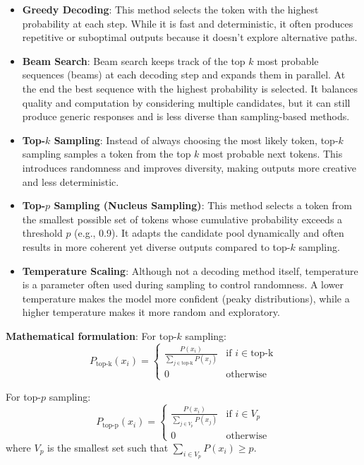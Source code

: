 \begin{itemize}
	\item \textbf{Greedy Decoding}: This method selects the token with the highest probability at each step. While it is fast and deterministic, it often produces repetitive or suboptimal outputs because it doesn't explore alternative paths.
	\item \textbf{Beam Search}: Beam search keeps track of the top \(k\) most probable sequences (beams) at each decoding step and expands them in parallel. At the end the best sequence with the highest probability is selected. It balances quality and computation by considering multiple candidates, but it can still produce generic responses and is less diverse than sampling-based methods.
	\item \textbf{Top-\(k\) Sampling}: Instead of always choosing the most likely token, top-\(k\) sampling samples a token from the top \(k\) most probable next tokens. This introduces randomness and improves diversity, making outputs more creative and less deterministic.
	\item \textbf{Top-\(p\) Sampling (Nucleus Sampling)}: This method selects a token from the smallest possible set of tokens whose cumulative probability exceeds a threshold \(p\) (e.g., 0.9). It adapts the candidate pool dynamically and often results in more coherent yet diverse outputs compared to top-\(k\) sampling.
	\item \textbf{Temperature Scaling}: Although not a decoding method itself, temperature is a parameter often used during sampling to control randomness. A lower temperature makes the model more confident (peaky distributions), while a higher temperature makes it more random and exploratory.
\end{itemize}

\textbf{Mathematical formulation}:
For top-\(k\) sampling:
\[
	P_{\text{top-k}}(x_i) = \begin{cases}
		\frac{P(x_i)}{\sum_{j \in \text{top-k}} P(x_j)} & \text{if } i \in \text{top-k} \\
		0                                               & \text{otherwise}
	\end{cases}
\]

For top-\(p\) sampling:
\[
	P_{\text{top-p}}(x_i) = \begin{cases}
		\frac{P(x_i)}{\sum_{j \in V_p} P(x_j)} & \text{if } i \in V_p \\
		0                                      & \text{otherwise}
	\end{cases}
\]
where \(V_p\) is the smallest set such that \(\sum_{i \in V_p} P(x_i) \geq p\).

